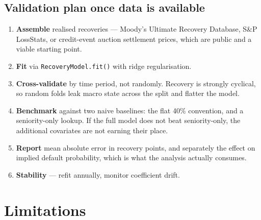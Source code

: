 \documentclass[11pt,a4paper]{article}
\begin{document}
\subsection{Validation plan once data is available}

\begin{enumerate}[leftmargin=1.4em,itemsep=0.2em]
\item \textbf{Assemble} realised recoveries --- Moody's Ultimate Recovery Database, S\&P
LossStats, or credit-event auction settlement prices, which are public and a viable
starting point.
\item \textbf{Fit} via \texttt{RecoveryModel.fit()} with ridge regularisation.
\item \textbf{Cross-validate} by time period, not randomly. Recovery is strongly
cyclical, so random folds leak macro state across the split and flatter the model.
\item \textbf{Benchmark} against two naive baselines: the flat 40\% convention, and a
seniority-only lookup. If the full model does not beat seniority-only, the additional
covariates are not earning their place.
\item \textbf{Report} mean absolute error in recovery points, and separately the effect
on implied default probability, which is what the analysis actually consumes.
\item \textbf{Stability} --- refit annually, monitor coefficient drift.
\end{enumerate}

\section{Limitations}
\end{document}
